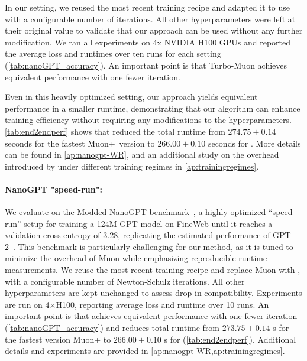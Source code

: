 In our setting, we reused the most recent training recipe and adapted it to use \turbomuon with a configurable number of iterations. All other hyperparameters were left at their original value to validate that our approach can be used without any further modification. We ran all experiments on 4x NVIDIA H100 GPUs and reported the average loss and runtimes over ten runs for each setting (\cref{tab:nanoGPT_accuracy}). An important point is that Turbo-Muon achieves equivalent performance with one fewer iteration.

Even in this heavily optimized setting, our approach yields equivalent performance in a smaller runtime, demonstrating that our algorithm can enhance training efficiency without requiring any modifications to the hyperparameters. \cref{tab:end2endperf} shows that \turbomuon reduced the total runtime from $274.75 \pm 0.14$ seconds for the fastest \color{dioncolor}Muon+\color{black}~version to $266.00 \pm 0.10$ seconds for \color{turbomuoncolor}\turbomuon{}\color{black}. More details can be found in \cref{ap:nanogpt-WR}, and an additional study on the overhead introduced by \turbomuon under different training regimes in \cref{ap:trainingregimes}.
\fi 

\paragraph{NanoGPT "speed-run":}
We evaluate \turbomuon on the Modded-NanoGPT benchmark~\cite{modded_nanogpt_2024}, a highly optimized “speed-run” setup for training a 124M GPT model on FineWeb until it reaches a validation cross-entropy of 3.28, replicating the estimated performance of GPT-2~\cite{radford2019language}. This benchmark is particularly challenging for our method, as it is tuned to minimize the overhead of Muon while emphasizing reproducible runtime measurements.
We reuse the most recent training recipe and replace Muon with \turbomuon, with a configurable number of Newton-Schulz iterations. All other hyperparameters are kept unchanged to assess drop-in compatibility. Experiments are run on 4×H100, reporting average loss and runtime over 10 runs.
An important point is that \turbomuon achieves equivalent performance with one fewer iteration (\cref{tab:nanoGPT_accuracy}) and reduces total runtime from $273.75 \pm 0.14$ s for the fastest version \textcolor{dioncolor}{Muon+} to $266.00 \pm 0.10$ s for \textcolor{turbomuoncolor}{\turbomuon{}}(\cref{tab:end2endperf}). Additional details and experiments are provided in \cref{ap:nanogpt-WR,ap:trainingregimes}.

